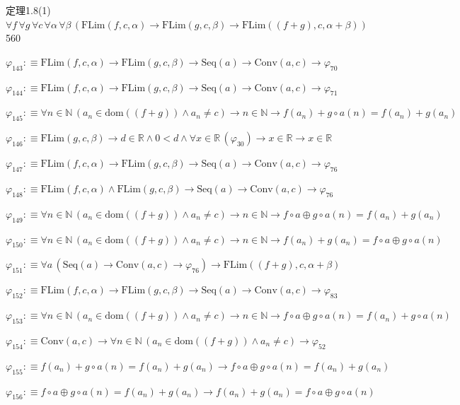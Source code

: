 \begin{fullproof}{定理1.8(1)}{$\forall f\,\forall g\,\forall c\,\forall \alpha\,\forall \beta\,(\mathrm{FLim}(f,c,\alpha) \to \mathrm{FLim}(g,c,\beta) \to \mathrm{FLim}((f + g),c,\alpha + \beta))$}{560}
\begin{abbrevlist}
\item $\varphi_{143} :\equiv \mathrm{FLim}(f,c,\alpha) \to \mathrm{FLim}(g,c,\beta) \to \mathrm{Seq}(a) \to \mathrm{Conv}(a,c) \to \varphi_{70}$
\item $\varphi_{144} :\equiv \mathrm{FLim}(f,c,\alpha) \to \mathrm{FLim}(g,c,\beta) \to \mathrm{Seq}(a) \to \mathrm{Conv}(a,c) \to \varphi_{71}$
\item $\varphi_{145} :\equiv \forall n \in \mathbb{N}\,(a_{n} \in \mathrm{dom}((f + g)) \land a_{n} \neq c) \to n \in \mathbb{N} \to f(a_{n}) + g \circ a(n) = f(a_{n}) + g(a_{n})$
\item $\varphi_{146} :\equiv \mathrm{FLim}(g,c,\beta) \to d \in \mathbb{R} \land 0 < d \land \forall x \in \mathbb{R}\,(\varphi_{30}) \to x \in \mathbb{R} \to x \in \mathbb{R}$
\item $\varphi_{147} :\equiv \mathrm{FLim}(f,c,\alpha) \to \mathrm{FLim}(g,c,\beta) \to \mathrm{Seq}(a) \to \mathrm{Conv}(a,c) \to \varphi_{76}$
\item $\varphi_{148} :\equiv \mathrm{FLim}(f,c,\alpha) \land \mathrm{FLim}(g,c,\beta) \to \mathrm{Seq}(a) \to \mathrm{Conv}(a,c) \to \varphi_{76}$
\item $\varphi_{149} :\equiv \forall n \in \mathbb{N}\,(a_{n} \in \mathrm{dom}((f + g)) \land a_{n} \neq c) \to n \in \mathbb{N} \to f \circ a \oplus g \circ a(n) = f(a_{n}) + g(a_{n})$
\item $\varphi_{150} :\equiv \forall n \in \mathbb{N}\,(a_{n} \in \mathrm{dom}((f + g)) \land a_{n} \neq c) \to n \in \mathbb{N} \to f(a_{n}) + g(a_{n}) = f \circ a \oplus g \circ a(n)$
\item $\varphi_{151} :\equiv \forall a\,(\mathrm{Seq}(a) \to \mathrm{Conv}(a,c) \to \varphi_{76}) \to \mathrm{FLim}((f + g),c,\alpha + \beta)$
\item $\varphi_{152} :\equiv \mathrm{FLim}(f,c,\alpha) \to \mathrm{FLim}(g,c,\beta) \to \mathrm{Seq}(a) \to \mathrm{Conv}(a,c) \to \varphi_{83}$
\item $\varphi_{153} :\equiv \forall n \in \mathbb{N}\,(a_{n} \in \mathrm{dom}((f + g)) \land a_{n} \neq c) \to n \in \mathbb{N} \to f \circ a \oplus g \circ a(n) = f(a_{n}) + g \circ a(n)$
\item $\varphi_{154} :\equiv \mathrm{Conv}(a,c) \to \forall n \in \mathbb{N}\,(a_{n} \in \mathrm{dom}((f + g)) \land a_{n} \neq c) \to \varphi_{52}$
\item $\varphi_{155} :\equiv f(a_{n}) + g \circ a(n) = f(a_{n}) + g(a_{n}) \to f \circ a \oplus g \circ a(n) = f(a_{n}) + g(a_{n})$
\item $\varphi_{156} :\equiv f \circ a \oplus g \circ a(n) = f(a_{n}) + g(a_{n}) \to f(a_{n}) + g(a_{n}) = f \circ a \oplus g \circ a(n)$

\end{abbrevlist}
\end{fullproof}
